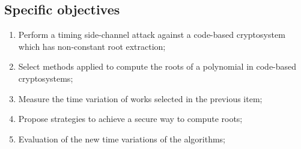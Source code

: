 \subsection{Specific objectives}
\begin{enumerate}[label=\roman*., itemsep=1pt]
    \item Perform a timing side-channel attack against a code-based cryptosystem which has non-constant root extraction;
    \item Select methods applied to compute the roots of a polynomial in code-based cryptosystems;
    \item Measure the time variation of works selected in the previous item;
    \item Propose strategies to achieve a secure way to compute roots;
    \item Evaluation of the new time variations of the algorithms;
\end{enumerate}


